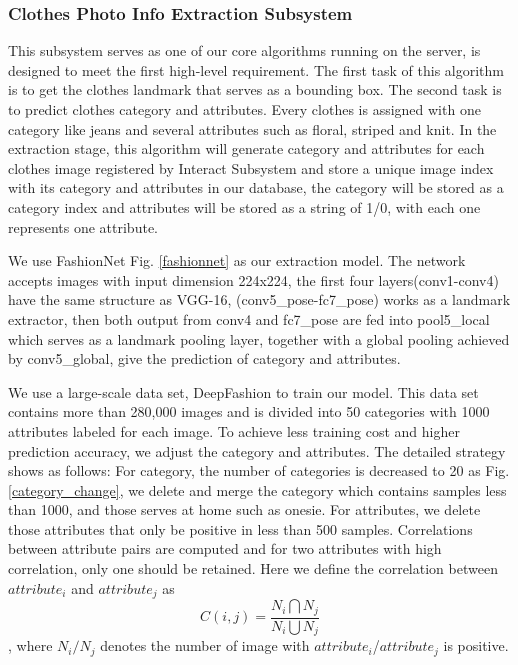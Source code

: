 \subsubsection{Clothes Photo Info Extraction Subsystem}
This subsystem serves as one of our core algorithms running on the server, is designed to meet the first high-level requirement. The first task of this algorithm is to get the clothes landmark that serves as a bounding box. The second task is to predict clothes category and attributes. Every clothes is assigned with one category like jeans and several attributes such as floral, striped and knit. In the extraction stage, this algorithm will generate category and attributes for each clothes image registered by Interact Subsystem and store a unique image index with its category and attributes in our database, the category will be stored as a category index and attributes will be stored as a string of 1/0, with each one represents one attribute.  

We use FashionNet Fig. \ref{fashionnet} as our extraction model\cite{liu2016deepfashion}. The network accepts images with input dimension 224x224, the first four layers(conv1-conv4) have the same structure as VGG-16\cite{vgg}, (conv5\_pose-fc7\_pose) works as a landmark extractor, then both output from conv4 and fc7\_pose are fed into pool5\_local which serves as a landmark pooling layer, together with a global pooling achieved by conv5\_global, give the prediction of category and attributes.  

We use a large-scale data set, DeepFashion \cite{liu2016deepfashion} to train our model. This data set contains more than 280,000 images and is divided into 50 categories with 1000 attributes labeled for each image. To achieve less training cost and higher prediction accuracy, we adjust the category and attributes. The detailed strategy shows as follows: For category, the number of categories is decreased to 20 as Fig. \ref{category_change}, we delete and merge the category which contains samples less than 1000, and those serves at home such as onesie. For attributes, we delete those attributes that only be positive in less than 500 samples. Correlations between attribute pairs are computed and for two attributes with high correlation, only one should be retained. Here we define the correlation between $attribute_i$ and $attribute_j$ as $$C(i,j)=\frac{N_i\bigcap N_j}{N_i \bigcup N_j}$$, where $N_i/N_j$ denotes the number of image with $attribute_i$/$attribute_j$ is positive.  

